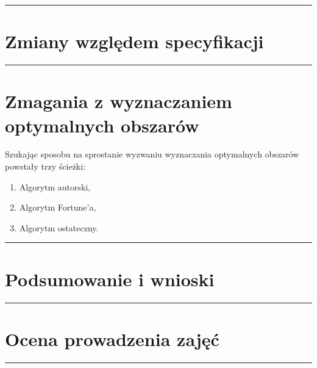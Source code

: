 \documentclass[a4paper,11pt]{article}
\newcommand{\linia}{\rule{\linewidth}{0.4mm}}
\begin{document}
\noindent\linia
\section{Zmiany względem specyfikacji}

\noindent\linia
\section{Zmagania z wyznaczaniem optymalnych obszarów}
Szukając sposobu na sprostanie wyzwaniu wyznaczania optymalnych obszarów powstały trzy ścieżki:
\begin{enumerate}
\item Algorytm autorski,
\item Algorytm Fortune'a,
\item Algorytm ostateczny.
\end{enumerate}
\noindent\linia
\section{Podsumowanie i wnioski}

\noindent\linia
\section{Ocena prowadzenia zajęć}

\noindent\linia
\end{document}
